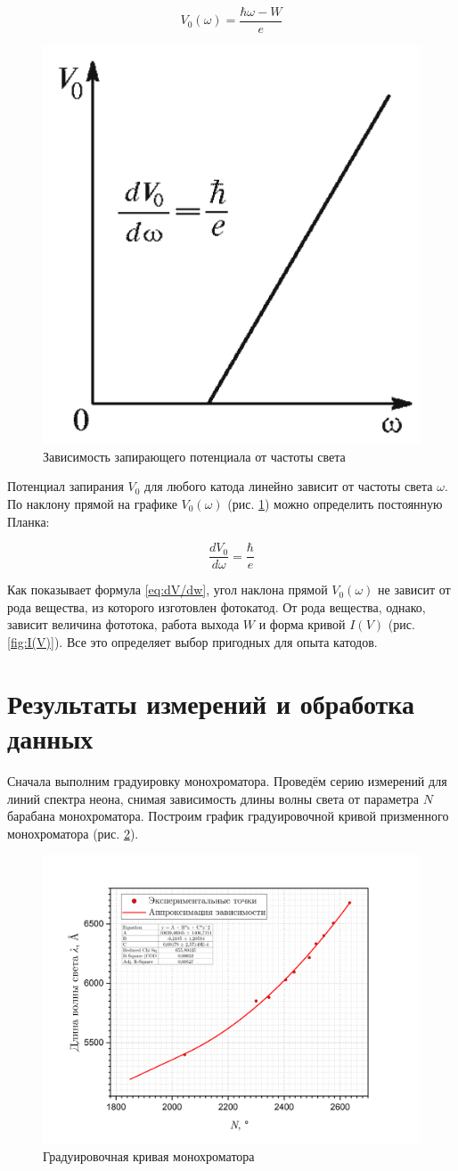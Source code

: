 \documentclass[a4paper, 12pt]{article}
\begin{document}
	\begin{equation}
        \label{eq:V(w)}
        V_0 (\omega) = \frac{\hbar\omega - W}{e}
	\end{equation}

    \begin{figure}[H]
        \centering
        \includegraphics[width = 0.25 \textwidth]{images/V(w).png}
        \caption{Зависимость запирающего потенциала от частоты света}
        \label{fig:V(omega)}
    \end{figure}
	
	Потенциал запирания $V_0$ для любого катода линейно зависит от
	частоты света $ \omega $. По наклону прямой на графике $ V_0(\omega) $ (рис. \ref{fig:V(omega)}) можно определить постоянную Планка:
	
	\begin{equation}
        \label{eq:dV/dw}
        \frac{dV_0}{d\omega} = \frac{\hbar}{e}
	\end{equation}
	
	Как показывает формула \eqref{eq:dV/dw}, угол наклона прямой $V_0(\omega)$ не зависит от рода вещества, из которого изготовлен фотокатод. От рода вещества, однако, зависит величина фототока, работа выхода $W$ и форма кривой $I(V)$ (рис. \ref{fig:I(V)}). Все это определяет выбор пригодных для
	опыта катодов.

    \newpage
	
    \section{Результаты измерений и обработка данных}

    Сначала выполним градуировку монохроматора. Проведём серию измерений для линий спектра неона, снимая зависимость длины волны света от параметра $N$ барабана монохроматора. Построим график градуировочной кривой призменного монохроматора (рис. \ref{fig:calibration}).

    \begin{figure}[H]
        \centering
        \includegraphics[width = 0.5\linewidth]{images/calibration_graph.png}
        \caption{Градуировочная кривая монохроматора}
        \label{fig:calibration}
    \end{figure}
\end{document}
